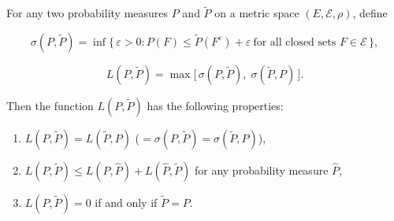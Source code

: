 For any two probability measures $P$ and $\tilde{P}$ on a metric space $(E, \mathcal{E}, \rho)$, define

$$\sigma(P, \tilde{P}) = \inf \{\, \varepsilon > 0 : P(F) \leq \tilde{P}(F^\varepsilon) + \varepsilon \ \text{for all closed sets } F \in \mathcal{E} \,\},$$

$$L(P, \tilde{P}) = \max\bigl[\,\sigma(P, \tilde{P}),\; \sigma(\tilde{P}, P)\,\bigr].$$

Then the function $L(P, \tilde{P})$ has the following properties:

\begin{enumerate}
\item[(a)] $L(P, \tilde{P}) = L(\tilde{P}, P)$ \bigl(${}= \sigma(P, \tilde{P}) = \sigma(\tilde{P}, P)$\bigr),
\item[(b)] $L(P, \tilde{P}) \leq L(P, \hat{P}) + L(\hat{P}, \tilde{P})$ for any probability measure $\hat{P}$,
\item[(c)] $L(P, \tilde{P}) = 0$ if and only if $\tilde{P} = P$.
\end{enumerate}
